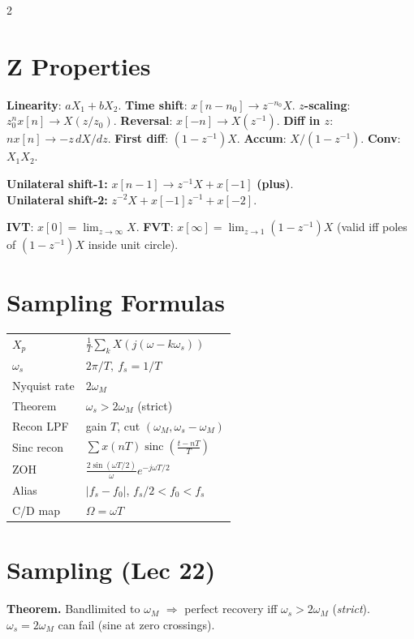 \documentclass[11pt,landscape]{extarticle}
\DeclareMathOperator{\sinc}{sinc}
\begin{document}
\begin{paracol}{2}
\switchcolumn

\section*{Z Properties}
\textbf{Linearity}: $aX_1+bX_2$. \textbf{Time shift}: $x[n{-}n_0]\to z^{-n_0}X$. \textbf{$z$-scaling}: $z_0^n x[n]\to X(z/z_0)$. \textbf{Reversal}: $x[-n]\to X(z^{-1})$. \textbf{Diff in $z$}: $nx[n]\to -z\,dX/dz$. \textbf{First diff}: $(1-z^{-1})X$. \textbf{Accum}: $X/(1-z^{-1})$. \textbf{Conv}: $X_1X_2$.

\textbf{Unilateral shift-1:} $x[n{-}1]\to z^{-1}X+x[-1]$ \textbf{(plus)}.\\
\textbf{Unilateral shift-2:} $z^{-2}X+x[-1]z^{-1}+x[-2]$.

\textbf{IVT}: $x[0]=\lim_{z\to\infty}X$. \textbf{FVT}: $x[\infty]=\lim_{z\to 1}(1-z^{-1})X$ (valid iff poles of $(1-z^{-1})X$ inside unit circle).

\switchcolumn*

\section*{Sampling Formulas}
\begin{tabular}{@{}l l@{}}
\toprule
$X_p$ & $\tfrac{1}{T}\!\sum_k X(j(\omega{-}k\omega_s))$ \\
$\omega_s$ & $2\pi/T,\ f_s{=}1/T$ \\
Nyquist rate & $2\omega_M$ \\
Theorem & $\omega_s{>}2\omega_M$ (strict) \\
Recon LPF & gain $T$, cut $(\omega_M,\omega_s{-}\omega_M)$ \\
Sinc recon & $\sum x(nT)\sinc(\tfrac{t{-}nT}{T})$ \\
ZOH & $\tfrac{2\sin(\omega T/2)}{\omega}e^{-j\omega T/2}$ \\
Alias & $|f_s{-}f_0|$, $f_s/2{<}f_0{<}f_s$ \\
C/D map & $\Omega{=}\omega T$ \\
\bottomrule
\end{tabular}

\switchcolumn

\section*{Sampling (Lec 22)}
\textbf{Theorem.} Bandlimited to $\omega_M$ $\Rightarrow$ perfect recovery iff $\omega_s>2\omega_M$ (\emph{strict}). $\omega_s=2\omega_M$ can fail (sine at zero crossings).


\end{paracol}
\end{document}
